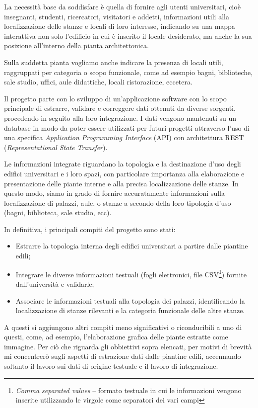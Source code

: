 \documentclass[12pt]{report}
\begin{document}
La necessità base da soddisfare è quella di fornire agli utenti
universitari, cioè insegnanti, studenti, ricercatori, visitatori
e addetti, informazioni utili alla localizzazione delle stanze 
e locali di loro interesse, indicando su una mappa interattiva
non solo l'edificio in cui è inserito il locale desiderato, ma anche 
la sua posizione all'interno della pianta architettonica. 

Sulla suddetta pianta vogliamo anche indicare la presenza di locali
utili, raggruppati per categoria o scopo funzionale, come ad esempio
 bagni, biblioteche, sale studio, uffici, aule didattiche, locali
ristorazione, eccetera.

Il progetto parte con lo sviluppo di un'applicazione software con 
lo scopo principale di estrarre, validare e correggere dati 
ottenuti da diverse sorgenti, procedendo in seguito alla loro integrazione.
I dati vengono mantenuti su un database in modo da poter essere 
utilizzati per futuri progetti attraverso l'uso di una specifica 
\textit{Application Programming Interface} (API) con architettura REST 
(\textit{Representational State Transfer}). 

Le informazioni integrate riguardano la topologia e la destinazione
d'uso degli edifici universitari e i loro spazi, con particolare
importanza alla elaborazione e presentazione delle piante interne e
alla precisa localizzazione delle stanze. In questo modo, siamo in grado di
fornire accuratamente informazioni sulla localizzazione di palazzi,
aule, o stanze a secondo della loro tipologia d'uso (bagni, 
biblioteca, sale studio, ecc).

In definitiva, i principali compiti del progetto sono stati:
\begin{itemize}
  \item Estrarre la topologia interna degli edifici universitari a
partire dalle piantine edili;
  \item Integrare le diverse informazioni testuali (fogli elettronici,
file CSV\footnote{\textit{Comma separated values} -- formato testuale
in cui le informazioni vengono inserite utilizzando le virgole come
separatori dei vari campi}) fornite dall'università e validarle;
  \item Associare le informazioni testuali alla topologia dei palazzi,
identificando la localizzazione di stanze rilevanti e la categoria
funzionale delle altre stanze.
\end{itemize}

A questi si aggiungono altri compiti meno significativi o riconducibili a uno
di questi, come, ad esempio, l'elaborazione grafica delle piante estratte
come immagine. Per ciò che riguarda gli obbiettivi sopra elencati, per 
motivi di brevità mi concentrerò sugli aspetti di estrazione dati
dalle piantine edili, accennando soltanto il lavoro sui dati di origine
testuale e il lavoro di integrazione.
\end{document}
